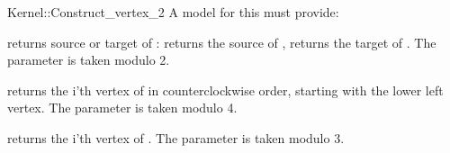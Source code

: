 \begin{ccRefFunctionObjectConcept}{Kernel::Construct_vertex_2}
A model for this must provide:



 {returns source or target of : \ccVar{}
  returns the source of , \ccVar{} returns the target
  of . The parameter  is taken modulo 2. }

 {returns the i'th vertex of
   in counterclockwise order, starting with the lower left
  vertex. The parameter  is taken modulo 4.}

 {returns the i'th vertex of . The parameter
   is taken modulo 3.}


\end{ccRefFunctionObjectConcept}

